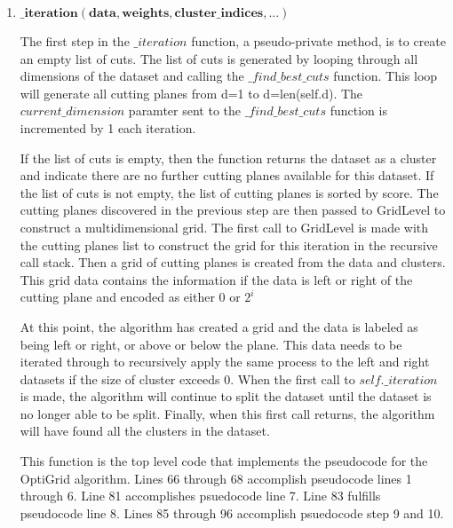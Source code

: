 \begin{enumerate}
    \item $\mathbf{\_iteration(data, weights, cluster\_indices, ...)}$\newline
    {The first step in the $\_iteration$ function, a pseudo-private method, is to create an empty list of cuts. 
    The list of cuts is generated by looping through all dimensions of the dataset and calling the $\_find\_best\_cuts$ function. This loop will generate all cutting planes from d=1 to d=len(self.d). 
    The $current\_dimension$ paramter sent to the $\_find\_best\_cuts$ function is incremented by 1 each iteration.\par
    If the list of cuts is empty, then the function returns the dataset as a cluster and indicate there are no further cutting planes available for this dataset. 
    If the list of cuts is not empty, the list of cutting planes is sorted by score. 
    The cutting planes discovered in the previous step are then passed to GridLevel to construct a multidimensional grid. 
    The first call to GridLevel is made with the cutting planes list to construct the grid for this iteration in the recursive call stack. 
    Then a grid of cutting planes is created from the data and clusters. This grid data contains the information if the data is left or right of the cutting plane and encoded as either 0 or ${2^i}$\par
    At this point, the algorithm has created a grid and the data is labeled as being left or right, or above or below the plane. 
    This data needs to be iterated through to recursively apply the same process to the left and right datasets if the size of cluster exceeds 0.
    When the first call to $self.\_iteration$ is made, the algorithm will continue to split the dataset until the dataset is no longer able to be split. 
    Finally, when this first call returns, the algorithm will have found all the clusters in the dataset.\par
    This function is the top level code that implements the pseudocode for the OptiGrid algorithm. Lines 66 through 68 accomplish pseudocode lines 1 through 6. Line 81 accomplishes psuedocode line 7. Line 83 fulfills pseudocode line 8. Lines 85 through 96 accomplish psuedocode step 9 and 10.}       



\end{enumerate}
